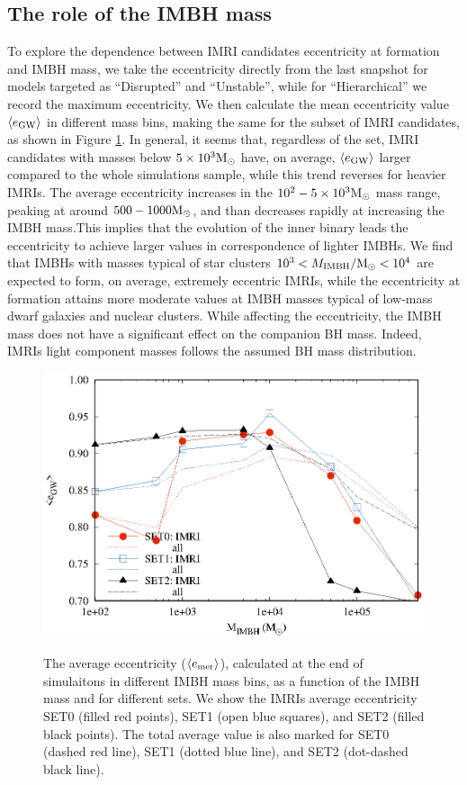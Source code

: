 \documentclass[twocolumn]{aastex62}
\newcommand{\Ms}{{\rm M}_\odot}
\newcommand{\gw}{{\rm GW}}
\newcommand{\ibh}{{\rm IMBH}}
\begin{document}
\subsection{The role of the IMBH mass}

To explore the dependence between IMRI candidates eccentricity at formation and IMBH mass, we take the eccentricity directly from the last snapshot for models targeted as ``Disrupted'' and ``Unstable'', while for ``Hierarchical'' we record the maximum eccentricity. We then calculate the mean eccentricity value $\langle e_\gw\rangle$  in different mass bins, making the same for the subset of IMRI candidates, as shown in Figure \ref{fig:f5}. In general, it seems that, regardless of the set, IMRI candidates with masses below $5\times10^3\Ms$ have, on average, $\langle e_\gw\rangle$ larger compared to the whole simulations sample, while this trend reverses for heavier IMRIs. 
The average eccentricity increases in the $10^2-5\times10^3\Ms$ mass range, peaking at around $500-1000\Ms$, and than decreases rapidly at increasing the IMBH mass.This implies that the evolution of the inner binary leads the eccentricity to achieve larger values in correspondence of lighter IMBHs. We find that IMBHs with masses typical of star clusters $10^3<M_\ibh/\Ms<10^4$ are expected to form, on average, extremely eccentric IMRIs, while the eccentricity at formation attains more moderate values at IMBH masses typical of low-mass dwarf galaxies and nuclear clusters.
While affecting the eccentricity, the IMBH mass does not have a significant effect on the companion BH mass. Indeed, IMRIs light component masses follows the assumed BH mass distribution. 

\begin{figure}
\centering
\includegraphics[width=\columnwidth]{average_ecc_sets}\\
\caption{The average eccentricity ($\langle e_{\rm mer}\rangle$), calculated at the end of simulaitons in different IMBH mass bins, as a function of the IMBH mass and for different sets. We show the IMRIs average eccentricity SET0 (filled red points), SET1 (open blue squares), and SET2 (filled black points). The total average value is also marked for SET0 (dashed red line), SET1 (dotted blue line), and SET2 (dot-dashed black line). }
\label{fig:f5}
\end{figure}
\end{document}
